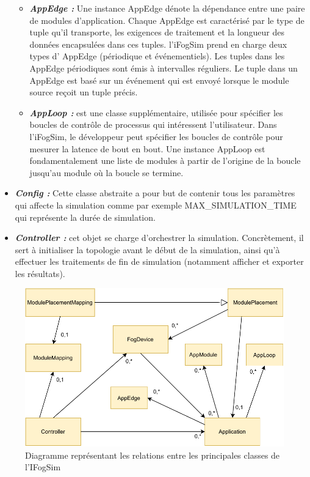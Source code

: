 \begin{itemize}
    \begin{itemize}
        \item \textbf{\emph{AppEdge :}} Une instance AppEdge dénote la dépendance entre une paire de modules d'application. Chaque AppEdge est caractérisé par le type de tuple qu'il transporte, les exigences de traitement et la longueur des données encapsulées dans ces tuples. l’iFogSim prend en charge deux types d’ AppEdge (périodique et événementiels). Les tuples dans les AppEdge périodiques sont émis à intervalles réguliers. Le tuple dans un AppEdge est basé sur un événement qui est envoyé lorsque le module source reçoit un tuple précis.
        \item \textbf{\emph{AppLoop :}} est une classe supplémentaire, utilisée pour spécifier les boucles de contrôle de processus qui intéressent l'utilisateur. Dans l’iFogSim, le développeur peut spécifier les boucles de contrôle pour mesurer la latence de bout en bout. Une instance AppLoop est fondamentalement une liste de modules à partir de l'origine de la boucle jusqu'au module où la boucle se termine.
    \end{itemize}
    \item \textbf{\emph{Config :}} Cette classe abstraite a pour but de contenir tous les paramètres qui affecte la simulation comme par exemple MAX\_SIMULATION\_TIME qui représente la durée de simulation.
    \item \textbf{\emph{Controller :}} cet objet se charge d’orchestrer la simulation. Concrètement, il sert à initialiser la topologie avant le début de la simulation, ainsi qu’à effectuer les traitements de fin de simulation (notamment afficher et exporter les résultats).
\end{itemize}
\begin{figure}[H]
    \centering
    \includegraphics[]{src/ressources/Diagramme de relation.pdf}
    \caption{Diagramme représentant les relations entre les principales classes de l'IFogSim}
    \label{fig:}
\end{figure}

